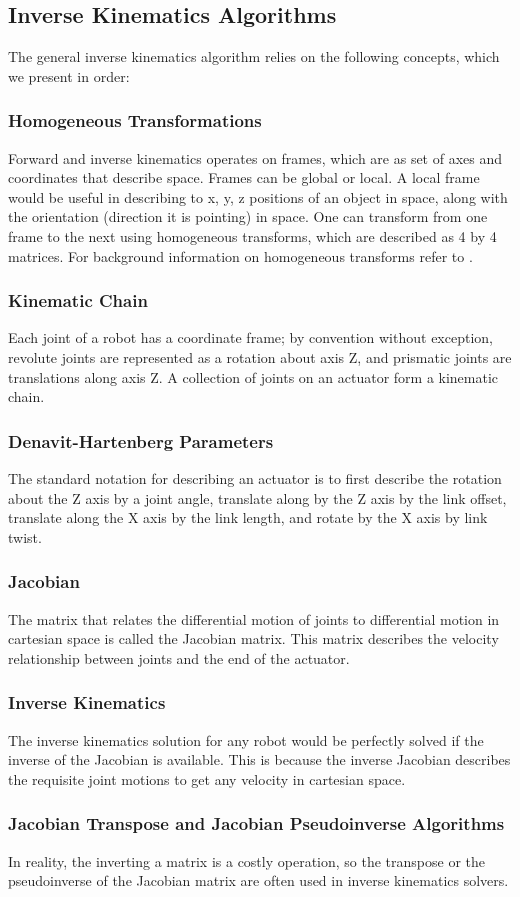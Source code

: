 \subsection*{Inverse Kinematics Algorithms}
The general inverse kinematics algorithm relies on the following concepts, which we present in order:

\subsubsection*{Homogeneous Transformations}
Forward and inverse kinematics operates on frames, which are as set of axes and coordinates that describe space. Frames can be global or local. A local frame would be useful in describing to x, y, z positions of an object in space, along with the orientation (direction it is pointing) in space. One can transform from one frame to the next using homogeneous transforms, which are described as 4 by 4 matrices. For background information on homogeneous transforms refer to \cite{frames}.

\subsubsection*{Kinematic Chain}
Each joint of a robot has a coordinate frame; by convention without exception, revolute joints are represented as a rotation about axis Z, and prismatic joints are translations along axis Z. A collection of joints on an actuator form a kinematic chain.

\subsubsection*{Denavit-Hartenberg Parameters}
The standard notation for describing an actuator is to first describe the rotation about the Z axis by a joint angle, translate along by the Z axis by the link offset, translate along the X axis by the link length, and rotate by the X axis by link twist.

\subsubsection*{Jacobian}
The matrix that relates the differential motion of joints to differential motion in cartesian space is called the Jacobian matrix. This matrix describes the velocity relationship between joints and the end of the actuator.\cite{jacobian}

\subsubsection*{Inverse Kinematics}
The inverse kinematics solution for any robot would be perfectly solved if the inverse of the Jacobian is available. This is because the inverse Jacobian describes the requisite joint motions to get any velocity in cartesian space.\cite{jacobian}

\subsubsection*{Jacobian Transpose and Jacobian Pseudoinverse Algorithms}
In reality, the inverting a matrix is a costly operation, so the transpose or the pseudoinverse of the Jacobian matrix are often used in inverse kinematics solvers.\cite{ik_intro}